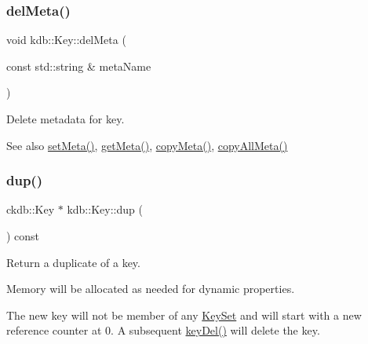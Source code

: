 \subsubsection{\texorpdfstring{delMeta()}{delMeta()}}
{\footnotesize\ttfamily void kdb\+::\+Key\+::del\+Meta (\begin{DoxyParamCaption}\item[{const std\+::string \&}]{meta\+Name }\end{DoxyParamCaption})\hspace{0.3cm}{\ttfamily [inline]}}



Delete metadata for key. 

\begin{DoxySeeAlso}{See also}
\mbox{\hyperlink{classkdb_1_1Key_a4c5a3d463127ade0b766c4298002daa3}{set\+Meta()}}, \mbox{\hyperlink{classkdb_1_1Key_acdd4e81b0565756c99826bf926fd6fe4}{get\+Meta()}}, \mbox{\hyperlink{classkdb_1_1Key_a53f6d2196a7f17c4bdc544207bdc5f4c}{copy\+Meta()}}, \mbox{\hyperlink{classkdb_1_1Key_aec0910bf293db33deac6a3f81359cb48}{copy\+All\+Meta()}} 
\end{DoxySeeAlso}
\mbox{\label{classkdb_1_1Key_ababb1ccd9f18db379eb4a62f8db87bf5}} 
\subsubsection{\texorpdfstring{dup()}{dup()}}
{\footnotesize\ttfamily ckdb\+::\+Key $\ast$ kdb\+::\+Key\+::dup (\begin{DoxyParamCaption}{ }\end{DoxyParamCaption}) const\hspace{0.3cm}{\ttfamily [inline]}}



Return a duplicate of a key. 

Memory will be allocated as needed for dynamic properties.

The new key will not be member of any \mbox{\hyperlink{classkdb_1_1KeySet}{Key\+Set}} and will start with a new reference counter at 0. A subsequent \mbox{\hyperlink{group__key_ga3df95bbc2494e3e6703ece5639be5bb1}{key\+Del()}} will delete the key.



